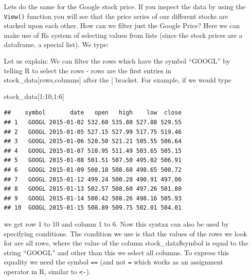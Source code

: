 \documentclass[
]{book}
\newenvironment{Shaded}{\begin{snugshade}}{\end{snugshade}}
\newcommand{\DecValTok}[1]{\textcolor[rgb]{0.00,0.00,0.81}{#1}}
\newcommand{\NormalTok}[1]{#1}
\newcommand{\OtherTok}[1]{\textcolor[rgb]{0.56,0.35,0.01}{#1}}
\newcommand{\SpecialCharTok}[1]{\textcolor[rgb]{0.00,0.00,0.00}{#1}}
\newcommand{\StringTok}[1]{\textcolor[rgb]{0.31,0.60,0.02}{#1}}
\begin{document}
Lets do the same for the Google stock price. If you inspect the data by using the \texttt{View()} function
you will see that the price series of our different stocks
are stacked upon each other. How can we filter just the
Google Price? Here we can make use of Rs system of selecting values from lists (since the
stock prices are a dataframe, a special list). We type:

\begin{Shaded}
\end{Shaded}

Let us explain: We can filter the rows which have the symbol ``GOOGL'' by telling R to select
the rows - rows are the first entries in stock\_data{[}rows,columns{]} after the {[} bracket.
For example, if we would type

\begin{Shaded}
\begin{Highlighting}[]
\NormalTok{stock\_data[}\DecValTok{1}\SpecialCharTok{:}\DecValTok{10}\NormalTok{,}\DecValTok{1}\SpecialCharTok{:}\DecValTok{6}\NormalTok{]}
\end{Highlighting}
\end{Shaded}

\begin{verbatim}
##    symbol       date   open   high    low  close
## 1   GOOGL 2015-01-02 532.60 535.80 527.88 529.55
## 2   GOOGL 2015-01-05 527.15 527.99 517.75 519.46
## 3   GOOGL 2015-01-06 520.50 521.21 505.55 506.64
## 4   GOOGL 2015-01-07 510.95 511.49 503.65 505.15
## 5   GOOGL 2015-01-08 501.51 507.50 495.02 506.91
## 6   GOOGL 2015-01-09 508.18 508.60 498.65 500.72
## 7   GOOGL 2015-01-12 499.24 500.28 490.91 497.06
## 8   GOOGL 2015-01-13 502.57 508.60 497.26 501.80
## 9   GOOGL 2015-01-14 500.42 508.26 498.16 505.93
## 10  GOOGL 2015-01-15 508.89 509.75 502.01 504.01
\end{verbatim}

we get row 1 to 10 and column 1 to 6. Now this syntax can also be used by
specifying conditions. The
condition we use is that the values of the rows we look for are all rows, where
the value of the column stock\_data\$symbol is equal to the string ``GOOGL'' and other than this
we select all columns. To express this equality we need the symbol \texttt{==} (and not \texttt{=} which
works as an assignment operator in R, similar to \texttt{\textless{}-}).
\end{document}
